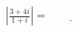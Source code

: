 \documentclass[border=0pt,12pt]{standalone}
\begin{document}
$\displaystyle \left|\frac{3+4i}{1+i}\right|=\underline{\hspace{4em}}$
\end{document}
